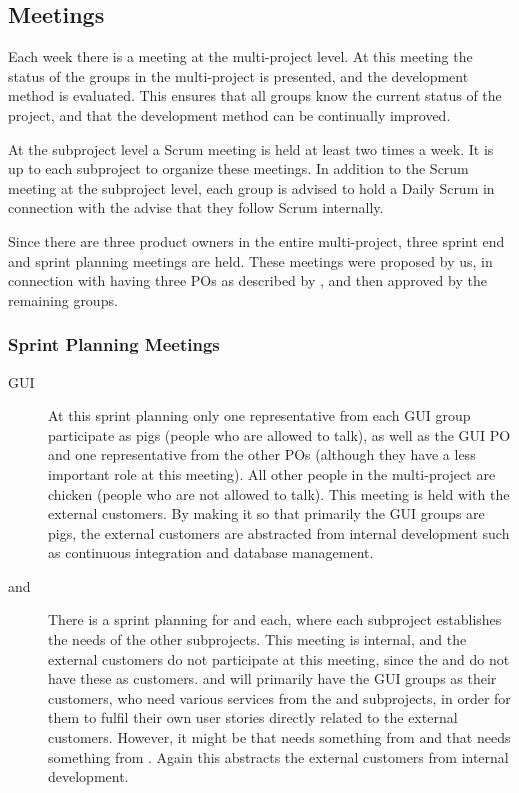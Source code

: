 
\subsection{Meetings}\label{sec:scrum_meetings}
Each week there is a meeting at the multi-project level. At this meeting the status of the groups in the multi-project is presented, and the development method is evaluated. This ensures that all groups know the current status of the project, and that the development method can be continually improved.

At the subproject level a Scrum meeting is held at least two times a week. It is up to each subproject to organize these meetings. In addition to the Scrum meeting at the subproject level, each group is advised to hold a Daily Scrum in connection with the advise that they follow Scrum internally.

Since there are three product owners in the entire multi-project, three sprint end and sprint planning meetings are held. These meetings were proposed by us, in connection with having three POs as described by \textcite{bird_davies_2007}, and then approved by the remaining groups.

\subsubsection{Sprint Planning Meetings}
\begin{description}
  \item[GUI] At this sprint planning only one representative from each GUI group participate as pigs (people who are allowed to talk), as well as the GUI PO and one representative from the other POs (although they have a less important role at this meeting). All other people in the multi-project are chicken (people who are not allowed to talk). This meeting is held with the external customers. By making it so that primarily the GUI groups are pigs, the external customers are abstracted from internal development such as continuous integration and database management.
  \item[\db and \bd] There is a sprint planning for \db and \bd each, where each subproject establishes the needs of the other subprojects. This meeting is internal, and the external customers do not participate at this meeting, since the \db and \bd do not have these as customers. \db and \bd will primarily have the GUI groups as their customers, who need various services from the \db and \bd subprojects, in order for them to fulfil their own user stories directly related to the external customers. However, it might be that \db needs something from \bd and that \bd needs something from \db. Again this abstracts the external customers from internal development.
\end{description}
